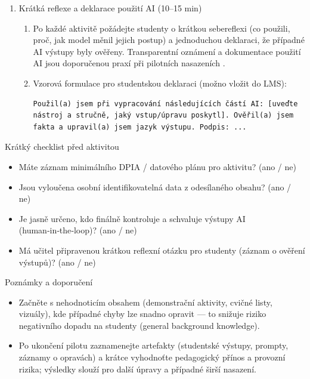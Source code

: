 \documentclass{report}%
\begin{document}
\begin{enumerate}
  \item Krátká reflexe a deklarace použití AI (10–15 min)
    \begin{enumerate}
      \item Po každé aktivitě požádejte studenty o krátkou sebereflexi (co použili, proč, jak model měnil jejich postup) a jednoduchou deklaraci, že případné AI výstupy byly ověřeny. Transparentní oznámení a dokumentace použití AI jsou doporučenou praxí při pilotních nasazeních \cite{kb_malinka_chatgpt_ve_vyuce_dva_roky_pote_2024_pdf_90bc3aaf_page_12_1}.
      \item Vzorová formulace pro studentskou deklaraci (možno vložit do LMS):
\begin{verbatim}
Použil(a) jsem při vypracování následujících částí AI: [uveďte nástroj a stručně, jaký vstup/úpravu poskytl]. Ověřil(a) jsem fakta a upravil(a) jsem jazyk výstupu. Podpis: ...
\end{verbatim}
    \end{enumerate}
\end{enumerate}

Krátký checklist před aktivitou
\begin{itemize}
  \item Máte záznam minimálního DPIA / datového plánu pro aktivitu? (ano / ne) \cite{kb_malinka_chatgpt_ve_vyuce_dva_roky_pote_2024_pdf_90bc3aaf_page_12_1}
  \item Jsou vyloučena osobní identifikovatelná data z odesílaného obsahu? (ano / ne) \cite{kb_malinka_chatgpt_ve_vyuce_dva_roky_pote_2024_pdf_90bc3aaf_page_12_1}
  \item Je jasně určeno, kdo finálně kontroluje a schvaluje výstupy AI (human‑in‑the‑loop)? (ano / ne) \cite{kb_malinka_chatgpt_ve_vyuce_dva_roky_pote_2024_pdf_90bc3aaf_page_12_1}
  \item Má učitel připravenou krátkou reflexní otázku pro studenty (záznam o ověření výstupů)? (ano / ne)
\end{itemize}

Poznámky a doporučení
\begin{itemize}
  \item Začněte s nehodnoticím obsahem (demonstrační aktivity, cvičné listy, vizuály), kde případné chyby lze snadno opravit — to snižuje riziko negativního dopadu na studenty (general background knowledge).
  \item Po ukončení pilotu zaznamenejte artefakty (studentské výstupy, prompty, záznamy o opravách) a krátce vyhodnoťte pedagogický přínos a provozní rizika; výsledky slouží pro další úpravy a případné širší nasazení.
\end{itemize}%
\end{document}
